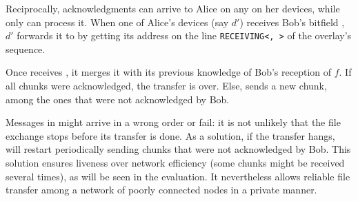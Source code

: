 Reciprocally, acknowledgments can arrive to Alice on any on her devices, while only \sendingdevice can process it.
When one of Alice's devices (say $d'$) receives Bob's bitfield \bitfield, 
$d'$ forwards it to \sendingdevice by getting its address on the line \texttt{RECEIVING<\sendingdevice, \fileid>} of the \squad overlay's sequence.


Once \sendingdevice receives \bitfield, it merges it with its previous knowledge of Bob's reception of $f$.
If all chunks were acknowledged, the transfer is over.
Else, \sendingdevice sends a new chunk, among the ones that were not acknowledged by Bob.

Messages in \name might arrive in a wrong order or fail:
it is not unlikely that the file exchange stops before its transfer is done.
As a solution, if the transfer hangs, \sendingdevice will restart periodically sending chunks that were not acknowledged by Bob.
This solution ensures liveness over network efficiency (some chunks might be received several times), as will be seen in the evaluation.
It nevertheless allows reliable file transfer among a network of poorly connected nodes in a private manner.